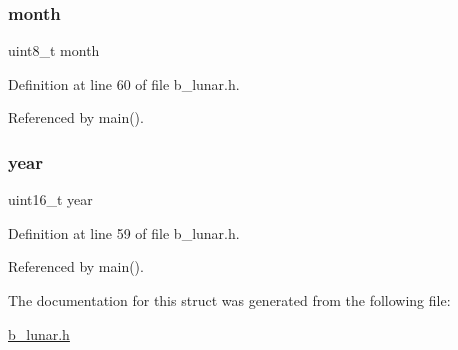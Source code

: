 \subsubsection{\texorpdfstring{month}{month}}
{\footnotesize\ttfamily uint8\+\_\+t month}



Definition at line 60 of file b\+\_\+lunar.\+h.



Referenced by main().

\mbox{\label{structb_lunar_info__t_a57ca98d8f6d4baf0fe41c583c7dcb0d5}} 
\subsubsection{\texorpdfstring{year}{year}}
{\footnotesize\ttfamily uint16\+\_\+t year}



Definition at line 59 of file b\+\_\+lunar.\+h.



Referenced by main().



The documentation for this struct was generated from the following file\+:\begin{DoxyCompactItemize}
\item 
\mbox{\hyperlink{b__lunar_8h}{b\+\_\+lunar.\+h}}\end{DoxyCompactItemize}
